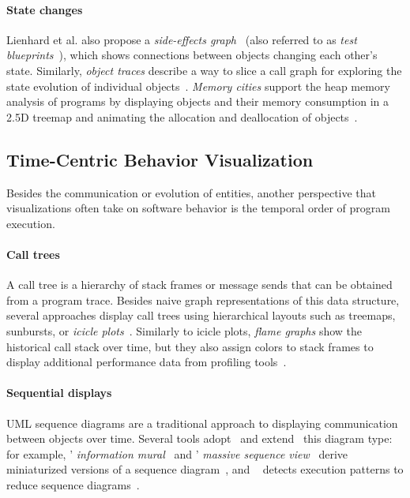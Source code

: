 \paragraph{State changes}

Lienhard et al. also propose a \emph{side-effects graph}~\cite{lienhard2009flow,fierz2009compass} (also referred to as \emph{test blueprints}~\cite{lienhard2008test}), which shows connections between objects changing each other's state.
Similarly, \emph{object traces} describe a way to slice a call graph for exploring the state evolution of individual objects~\cite{thiede2023object}.
\emph{Memory cities} support the heap memory analysis of programs by displaying objects and their memory consumption in a 2.5D treemap and animating the allocation and deallocation of objects~\cite{weninger2020memory}.

\subsection{Time-Centric Behavior Visualization}

Besides the communication or evolution of entities, another perspective that visualizations often take on software behavior is the temporal order of program execution.

\paragraph{Call trees}

A call tree is a hierarchy of stack frames or message sends that can be obtained from a program trace.
Besides naive graph representations of this data structure, several approaches display call trees using hierarchical layouts such as treemaps, sunbursts, or \emph{icicle plots}~\cite{kruskal1983icicle,trumper2012viewfusion,woodburn2019interactive}.
Similarly to icicle plots, \emph{flame graphs} show the historical call stack over time, but they also assign colors to stack frames to display additional performance data from profiling tools~\cite{gregg2016flame}.

\paragraph{Sequential displays}

UML sequence diagrams are a traditional approach to displaying communication between objects over time.
Several tools adopt~\cite{systä2001shimba} and extend~\cite{hamouLhadj2004survey} this diagram type: for example, ' \emph{information mural}~\cite{jerding1998information} and ' \emph{massive sequence view}~\cite{cornelissen2009trace} derive miniaturized versions of a sequence diagram~\cite[sec. 3.4]{lemieux2006visualization}, and ~\cite{dePauw1998execution} detects execution patterns to reduce sequence diagrams~\cite{hamouLhadj2004survey}.
